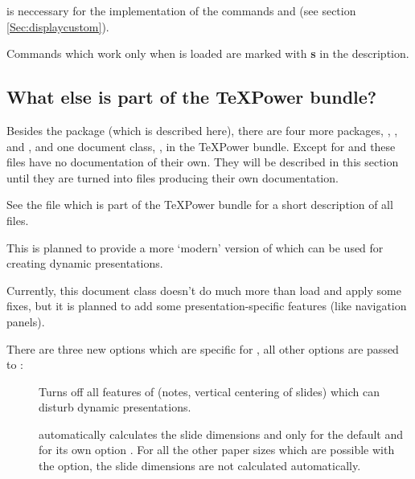 \begin{slide}
\begin{description}
\newslide

\item[\present{package: \code{soul}}]
  is neccessary for the implementation of the commands  and
   (see section \ref{Sec:displaycustom}).

  Commands which work only when  is loaded are marked with \textbf{\textsf{s}} in the description.
\end{description}

\newslide

\subsection{What else is part of the \TeX Power bundle?}
Besides the package  (which is described here), there are four
more packages, , ,  and
, and one document class, , in the \TeX Power bundle.
Except for  and  these files have no documentation
of their own. They will be described in this section until they are turned
into  files producing their own documentation.

See the file  which is part of the \TeX Power bundle for a short description of all files.

\newslide

This is planned to provide a more `modern' version of  which can be used for creating dynamic
presentations.

Currently, this document class doesn't do much more than load  and apply some fixes, but it is planned to
add some presentation-specific features (like navigation panels).

\newslide

There are three new options which are specific for , all other options are passed to :
\begin{description}
\item[]
  Turns off all features of  (notes, vertical centering of slides)
  which can disturb dynamic presentations.

\item[]
   automatically calculates the slide dimensions
   and  only for the default  and for its own option
  . For all the other paper sizes which are possible with the  option, the slide dimensions are not
  calculated automatically.


\end{description}
\end{slide}
